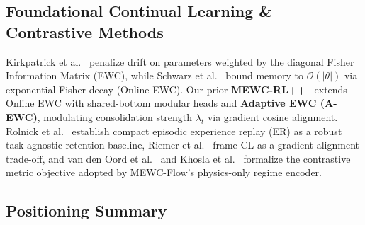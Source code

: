 \documentclass[11pt,a4paper]{article}
\begin{document}
\subsection{Foundational Continual Learning \& Contrastive Methods}

Kirkpatrick et al.~\cite{kirkpatrick2017ewc} penalize drift on parameters weighted by the diagonal Fisher Information Matrix (EWC), while Schwarz et al.~\cite{schwarz2018onlineewc} bound memory to $\mathcal{O}(|\theta|)$ via exponential Fisher decay (Online EWC). Our prior \textbf{MEWC-RL++}~\cite{hasan2026mewcrlpp} extends Online EWC with shared-bottom modular heads and \textbf{Adaptive EWC (A-EWC)}, modulating consolidation strength $\lambda_t$ via gradient cosine alignment. Rolnick et al.~\cite{rolnick2019er} establish compact episodic experience replay (ER) as a robust task-agnostic retention baseline, Riemer et al.~\cite{riemer2019mer} frame CL as a gradient-alignment trade-off, and van den Oord et al.~\cite{oord2018cpc} and Khosla et al.~\cite{khosla2020supcon} formalize the contrastive metric objective adopted by MEWC-Flow's physics-only regime encoder.

\subsection{Positioning Summary}
\end{document}
